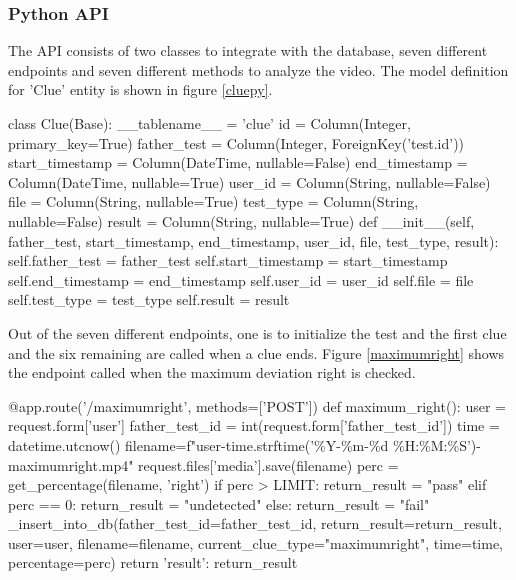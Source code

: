 \subsubsection{Python API}

The API consists of two classes to integrate with the database, seven different endpoints and seven different methods to analyze the video. The model definition for 'Clue' entity is shown in figure \ref{cluepy}.

  \begin{python}[basicstyle=\small, label={cluepy}, caption={Clue class in clue.py}, captionpos=b]
    class Clue(Base):
        __tablename__ = 'clue'
        id = Column(Integer, primary_key=True)
        father_test = Column(Integer, ForeignKey('test.id'))
        start_timestamp = Column(DateTime, nullable=False)
        end_timestamp = Column(DateTime, nullable=True)
        user_id = Column(String, nullable=False)
        file = Column(String, nullable=True)
        test_type = Column(String, nullable=False)
        result = Column(String, nullable=True)
        def __init__(self, father_test, start_timestamp, end_timestamp, user_id, file, test_type, result):
            self.father_test = father_test
            self.start_timestamp = start_timestamp
            self.end_timestamp = end_timestamp
            self.user_id = user_id
            self.file = file
            self.test_type = test_type
            self.result = result
  \end{python}

Out of the seven different endpoints, one is to initialize the test and the first clue and the six remaining are called when a clue ends. Figure \ref{maximumright} shows the endpoint called when the maximum deviation right is checked.

\begin{python}[label={maximumright}, caption={Enpoint to proccess the maximum deviation right}, captionpos=b]
  @app.route('/maximumright', methods=['POST'])
  def maximum_right():
    user = request.form['user']
    father_test_id = int(request.form['father_test_id'])
    time = datetime.utcnow()
    filename=f"{user}-{time.strftime('\%Y-\%m-\%d \%H:\%M:\%S')}-maximumright.mp4"
    request.files['media'].save(filename)
    perc = get_percentage(filename, 'right')
    if perc > LIMIT:
        return_result = "pass"
    elif perc == 0:
        return_result = "undetected"
    else:
        return_result = "fail"
    _insert_into_db(father_test_id=father_test_id, return_result=return_result, user=user, filename=filename,
                    current_clue_type="maximumright", time=time, percentage=perc)
    return {'result': return_result}
\end{python}

